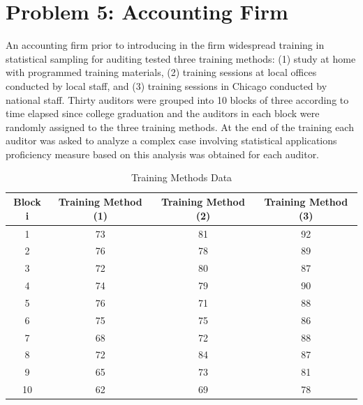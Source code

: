 \documentclass{article}
\begin{document}
\section*{Problem 5: Accounting Firm}
An accounting firm prior to introducing in the firm widespread training in statistical sampling
for auditing tested three training methods: (1) study at home with programmed training materials,
(2) training sessions at local offices conducted by local staff, and (3) training sessions in Chicago conducted
by national staff. Thirty auditors were grouped into 10 blocks of three according to time elapsed
since college graduation and the auditors in each block were randomly assigned to the three training
methods. At the end of the training each auditor was asked to analyze a complex case involving statistical
applications proficiency measure based on this analysis was obtained for each auditor.
\begin{table}[!ht]
	\centering
	\caption{Training Methods Data}
	\begin{tabular}{c c c c}
		\hline
		\textbf{Block i} & \textbf{Training Method (1)} & \textbf{Training Method (2)} & \textbf{Training Method (3)} \\
		\hline
		1                & 73                           & 81                           & 92                           \\
		2                & 76                           & 78                           & 89                           \\
		3                & 72                           & 80                           & 87                           \\
		4                & 74                           & 79                           & 90                           \\
		5                & 76                           & 71                           & 88                           \\
		6                & 75                           & 75                           & 86                           \\
		7                & 68                           & 72                           & 88                           \\
		8                & 72                           & 84                           & 87                           \\
		9                & 65                           & 73                           & 81                           \\
		10               & 62                           & 69                           & 78                           \\
		\hline
	\end{tabular}
\end{table}
\end{document}
